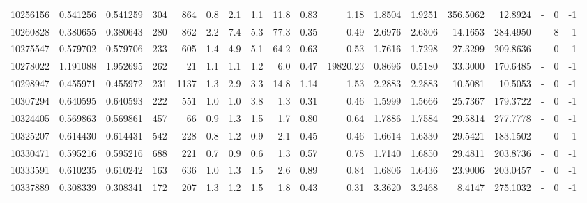 \begin{tabular}{rrrrrrrrrrrrrrrlrr}
  10256156 & 0.541256 &   0.541259 &  304 &  864 &      0.8 &      2.1 &     1.1 &     11.8 &       0.83 &        1.18 &  1.8504 &  1.9251 &  356.5062 &   12.8924 &             - &        0 &         -1 \\
  10260828 & 0.380655 &   0.380643 &  280 &  862 &      2.2 &      7.4 &     5.3 &     77.3 &       0.35 &        0.49 &  2.6976 &  2.6306 &   14.1653 &  284.4950 &             - &        8 &          1 \\
  10275547 & 0.579702 &   0.579706 &  233 &  605 &      1.4 &      4.9 &     5.1 &     64.2 &       0.63 &        0.53 &  1.7616 &  1.7298 &   27.3299 &  209.8636 &             - &        0 &         -1 \\
  10278022 & 1.191088 &   1.952695 &  262 &   21 &      1.1 &      1.1 &     1.2 &      6.0 &       0.47 &    19820.23 &  0.8696 &  0.5180 &   33.3000 &  170.6485 &             - &        0 &         -1 \\
  10298947 & 0.455971 &   0.455972 &  231 & 1137 &      1.3 &      2.9 &     3.3 &     14.8 &       1.14 &        1.53 &  2.2883 &  2.2883 &   10.5081 &   10.5053 &             - &        0 &         -1 \\
  10307294 & 0.640595 &   0.640593 &  222 &  551 &      1.0 &      1.0 &     3.8 &      1.3 &       0.31 &        0.46 &  1.5999 &  1.5666 &   25.7367 &  179.3722 &             - &        0 &         -1 \\
  10324405 & 0.569863 &   0.569861 &  457 &   66 &      0.9 &      1.3 &     1.5 &      1.7 &       0.80 &        0.64 &  1.7886 &  1.7584 &   29.5814 &  277.7778 &             - &        0 &         -1 \\
  10325207 & 0.614430 &   0.614431 &  542 &  228 &      0.8 &      1.2 &     0.9 &      2.1 &       0.45 &        0.46 &  1.6614 &  1.6330 &   29.5421 &  183.1502 &             - &        0 &         -1 \\
  10330471 & 0.595216 &   0.595216 &  688 &  221 &      0.7 &      0.9 &     0.6 &      1.3 &       0.57 &        0.78 &  1.7140 &  1.6850 &   29.4811 &  203.8736 &             - &        0 &         -1 \\
  10333591 & 0.610235 &   0.610242 &  163 &  636 &      1.0 &      1.3 &     1.5 &      2.6 &       0.89 &        0.84 &  1.6806 &  1.6436 &   23.9006 &  203.0457 &             - &        0 &         -1 \\
  10337889 & 0.308339 &   0.308341 &  172 &  207 &      1.3 &      1.2 &     1.5 &      1.8 &       0.43 &        0.31 &  3.3620 &  3.2468 &    8.4147 &  275.1032 &             - &        0 &         -1 \\

\end{tabular}

